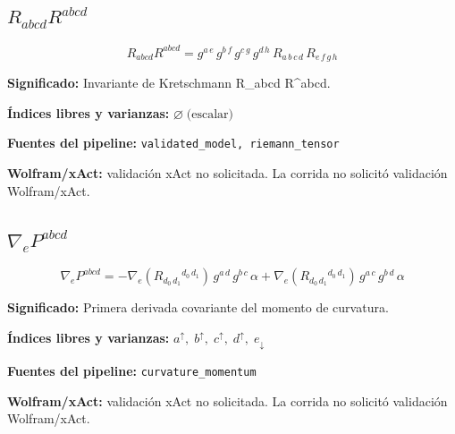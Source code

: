 \documentclass[11pt]{article}
\begin{document}
\subsection*{$ R_{abcd}R^{abcd} $}
\begin{dmath*}[breakdepth={5}]
R_{abcd}R^{abcd} = g{}^{a\,e}\,g{}^{b\,f}\,g{}^{c\,g}\,g{}^{d\,h}\,R{}_{a\,b\,c\,d}\,R{}_{e\,f\,g\,h}
\end{dmath*}
\par\vspace{1.2\baselineskip}\noindent
\begin{minipage}{\linewidth}
\textbf{Significado:} Invariante de Kretschmann R\_abcd R^abcd.\par
\textbf{Índices libres y varianzas:} $ \varnothing\;\text{(escalar)} $\par
\textbf{Fuentes del pipeline:} \texttt{validated\_model, riemann\_tensor}\par
\textbf{Wolfram/xAct:} validación xAct no solicitada. La corrida no solicitó validación Wolfram/xAct.\par
\end{minipage}
\subsection*{$ \nabla_e P^{abcd} $}
\begin{dmath*}[breakdepth={5}]
\nabla_e P^{abcd} = -\nabla_{e}\!\left(R{}_{d_{0}\,d_{1}}{}^{d_{0}\,d_{1}}\right)\,g{}^{a\,d}\,g{}^{b\,c}\,\alpha + \nabla_{e}\!\left(R{}_{d_{0}\,d_{1}}{}^{d_{0}\,d_{1}}\right)\,g{}^{a\,c}\,g{}^{b\,d}\,\alpha
\end{dmath*}
\par\vspace{1.2\baselineskip}\noindent
\begin{minipage}{\linewidth}
\textbf{Significado:} Primera derivada covariante del momento de curvatura.\par
\textbf{Índices libres y varianzas:} $ a^{\uparrow},\;b^{\uparrow},\;c^{\uparrow},\;d^{\uparrow},\;e_{\downarrow} $\par
\textbf{Fuentes del pipeline:} \texttt{curvature\_momentum}\par
\textbf{Wolfram/xAct:} validación xAct no solicitada. La corrida no solicitó validación Wolfram/xAct.\par
\end{minipage}
\end{document}
